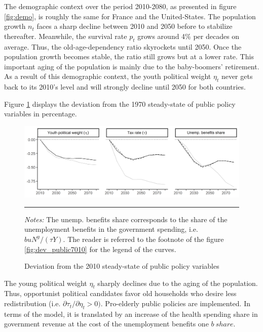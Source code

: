 The demographic context over the period 2010-2080, as presented in figure \ref{fig:demo}, is roughly the same for France and the United-States. The population growth $n_t$ faces a sharp decline between 2010 and 2050 before to stabilize thereafter. Meanwhile, the survival rate $p_t$ grows around 4\% per decades on average. Thus, the old-age-dependency ratio skyrockets until 2050. Once the population growth becomes stable, the ratio still grows but at a lower rate. This important aging of the population is mainly due to the baby-boomers' retirement. As a result of this demographic context, the youth political weight $\eta_t$ never gets back to its 2010's level and will strongly decline until 2050 for both countries.


Figure \ref{fig:dev_public1080} displays the deviation from the 1970 steady-state of public policy variables in percentage.
\begin{figure}[tb]
	\centering
	\includegraphics[width=1\linewidth]{../result/deviation/dev_public1080.png}
	\caption{Deviation from the 2010 steady-state of public policy variables}
	\label{fig:dev_public1080}
	\vspace{.5ex}
	\hrule
	\vspace{-4ex}
	\justify\singlespacing\footnotesize \textit{Notes:} The unemp. benefits share corresponds to the share of the unemployment benefits in the government spending, i.e. $buN^y/(\tau Y)$. The reader is referred to the footnote of the figure \ref{fig:dev_public7010} for the legend of the curves.
\end{figure}
The young political weight $\eta_t$ sharply declines due to the aging of the population. Thus, opportunist political candidates favor old households who desire less redistribution (i.e. $\partial\tau_t / \partial \eta_t > 0)$. Pro-elderly public policies are implemented. In terms of the model, it is translated by an increase of the health spending share in government revenue at the cost of the unemployment benefits one $b~share$.

